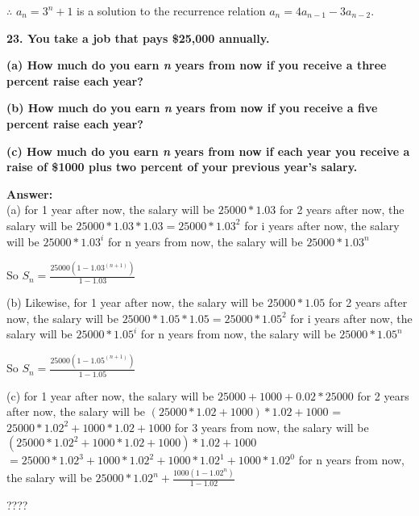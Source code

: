 \documentclass{article}
\begin{document}
\begin{large}
$\therefore$ $a_{n}={3^{n}+1}$ is a solution to the recurrence relation $a_{n}=4a_{n-1}-3a_{n-2}$.


\textbf{23. You take a job that pays \$25,000 annually.}

\textbf{(a) How much do you earn \emph{n} years from now if you receive a three percent raise each year?}

\textbf{(b) How much do you earn \emph{n} years from now if you receive a five percent raise each year? }

\textbf{(c) How much do you earn \emph{n} years from now if each year you receive a raise of \$1000 plus two percent of your previous year's salary.}

\textbf{Answer:} \\

(a) for 1 year after now, the salary will be $25000 * 1.03$
    for 2 years after now, the salary will be $25000 * 1.03 * 1.03 = 25000 * 1.03^2$
    for i years after now, the salary will be $25000 * 1.03^i$
    for n years from now, the salary will be $25000 * 1.03^n$

    So $S_{n} = \frac{25000 (1 - 1.03^(n+1))}{1-1.03}$

(b) Likewise, 
    for 1 year after now, the salary will be $25000 * 1.05$
    for 2 years after now, the salary will be $25000 * 1.05 * 1.05 = 25000 * 1.05^2$
    for i years after now, the salary will be $25000 * 1.05^i$
    for n years from now, the salary will be $25000 * 1.05^n$

    So $S_{n} = \frac{25000 (1 - 1.05^(n+1))}{1-1.05}$

(c) for 1 year after now, the salary will be $25000 + 1000 + 0.02 * 25000$
    for 2 years after now, the salary will be $(25000 * 1.02 + 1000) * 1.02 + 1000$
                                             = $25000 * 1.02^2 + 1000 * 1.02 + 1000$
    for 3 years from now, the salary will be $(25000 * 1.02^2 + 1000 * 1.02 + 1000) * 1.02 + 1000$
                                           $ = 25000 * 1.02^3 + 1000 * 1.02^2 + 1000 * 1.02^1 + 1000 * 1.02^0$
    for n years from now, the salary will be $25000 * 1.02^n + \frac {1000 (1 - 1.02^n)}{1 - 1.02}$

    ????

\end{large}
\end{document}

